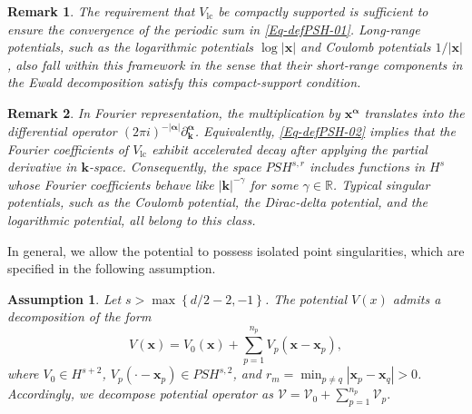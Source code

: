 \documentclass{sn-jnl}%
\numberwithin{equation}{section}
\theoremstyle{thmstyleone}%
\newtheorem{assumption}{Assumption}
\theoremstyle{thmstyletwo}%
\newtheorem{remark}{Remark}%
\theoremstyle{thmstylethree}%
\begin{document}
\begin{remark}
        The requirement that $V_{\mathrm{lc}}$ be compactly supported is sufficient to ensure the convergence of the periodic sum in \eqref{Eq-defPSH-01}. Long-range potentials, such as the logarithmic potentials $\log |\bm x|$ and Coulomb potentials $1/|\bm x|$, also fall within this framework in the sense that their short-range components in the Ewald decomposition \cite{toukmaji1996ewald} satisfy this compact-support condition.
\end{remark}

\begin{remark}
    In Fourier representation, the multiplication by $\bm x^{\bm \alpha}$ translates into the differential operator $(2\pi i)^{-|\bm \alpha|} \partial_{\bm k}^{\bm \alpha}$. Equivalently, \eqref{Eq-defPSH-02} implies that the Fourier coefficients of  $V_{\mathrm{lc}}$ exhibit accelerated decay after applying the partial derivative in $\bm k$-space. Consequently, the space  $PSH^{s,r}$ includes functions in $H^{s}$ whose Fourier coefficients behave like $|\bm k|^{-\gamma}$ for some $\gamma \in \mathbb{R}$. Typical singular potentials, such as the Coulomb potential, the Dirac‑delta potential, and the logarithmic potential, all belong to this class.
\end{remark}

In general, we allow the potential to possess isolated point singularities, which are specified in the following assumption.
\begin{assumption}\label{Asp::ARFSM}
Let $s > \max\left\{ d/2 - 2, -1 \right\}$. The potential $V(x)$ admits a decomposition of the form
\begin{equation}
V(\bm{x}) = V_{0}(\bm{x}) + \sum_{p=1}^{n_p} V_{p}(\bm{x} - \bm{x}_p),
\end{equation}
where $V_{0}\in H^{s+2}$, $V_{p}(\cdot-\bm x_p)\in PSH^{s,2}$,
and $r_m=\min_{p\neq q}|\bm x_p-\bm x_q|>0$.
Accordingly, we decompose potential operator as $ \mathcal{V}=\mathcal{V}_{0}+\sum_{p=1}^{n_p}\mathcal{V}_p.$
\end{assumption}
\end{document}
